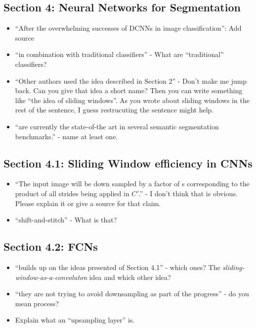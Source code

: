 \documentclass[a4paper,9pt]{scrartcl}
\begin{document}
\subsection{Section 4: Neural Networks for Segmentation}
\begin{itemize}
    \item \enquote{After the overwhelming successes of DCNNs in image classification}: Add source
    \item \enquote{in combination with traditional classifiers} - What are \enquote{traditional} classifiers?
    \item \enquote{Other authors used the idea described in Section 2} - Don't make me jump back. Can you give that idea a short name? Then you can write something like \enquote{the idea of sliding windows}. As you wrote about sliding windows in the rest of the sentence, I guess restrucuting the sentence might help.
    \item \enquote{are currently the state-of-the art in several semantic segmentation benchmarks.} - name at least one.
\end{itemize}

\subsection{Section 4.1: Sliding Window efficiency in CNNs}
\begin{itemize}
    \item \enquote{The input image will be down sampled by a factor of s corresponding to the product of all strides being applied in $C'$.} - I don't think that is obvious. Please explain it or give a source for that claim.
    \item \enquote{shift-and-stitch} - What is that?
\end{itemize}

\subsection{Section 4.2: FCNs}

\begin{itemize}
    \item \enquote{builds up on the ideas presented of Section 4.1} - which ones?
          The \textit{sliding-window-as-a-convoluton} idea and which other idea?
    \item \enquote{they are not trying to avoid downsampling as part of the progress}
          - do you mean process?
    \item Explain what an \enquote{upsampling layer} is.
\end{itemize}
\end{document}
